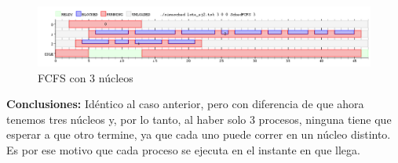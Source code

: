 \begin{figure}[H]
\begin{center}
\includegraphics[width=1.1\textwidth]{img/ej2_3.png}
     \caption{FCFS con 3 núcleos}
\end{center}
\end{figure}

\textbf{Conclusiones:} Idéntico al caso anterior, pero con diferencia de que ahora tenemos tres núcleos y, por lo tanto, al haber solo 3 procesos, ninguna tiene que esperar a que otro termine, ya que cada uno puede correr en un núcleo distinto. Es por ese motivo que cada proceso se ejecuta en el instante en que llega.













